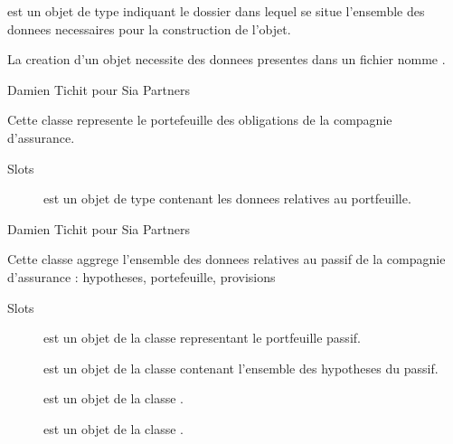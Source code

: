 \documentclass[a4paper]{book}
\begin{document}
%
\begin{Arguments}
\begin{ldescription}
\item[\code{address}] est un objet de type  indiquant le dossier dans lequel se situe l'ensemble des donnees necessaires
pour la construction de l'objet.
\end{ldescription}
\end{Arguments}
%
\begin{Details}\relax
La creation d'un objet  necessite des donnees presentes dans un fichier nomme .
\end{Details}
%
\begin{Author}\relax
Damien Tichit pour Sia Partners
\end{Author}
%
\begin{Description}\relax
Cette classe represente le portefeuille des obligations de la compagnie d'assurance.
\end{Description}
%
\begin{Section}{Slots}

\begin{description}

\item[] est un objet de type  contenant les donnees relatives au portfeuille.

\end{description}
\end{Section}
%
\begin{Author}\relax
Damien Tichit pour Sia Partners
\end{Author}
%
\begin{Description}\relax
Cette classe aggrege l'ensemble des donnees relatives au passif de la compagnie d'assurance : hypotheses, portefeuille, provisions
\end{Description}
%
\begin{Section}{Slots}

\begin{description}

\item[] est un objet de la classe  representant le portfeuille passif.

\item[] est un objet de la classe  contenant l'ensemble des hypotheses du passif.

\item[] est un objet de la classe .

\item[] est un objet de la classe .

\end{description}
\end{Section}
\end{document}
